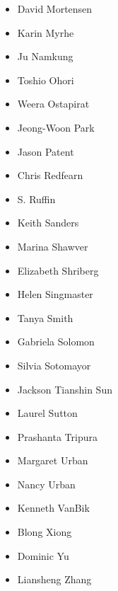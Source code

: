 \begin{multicols}{3}
\begin{itemize}
\item David Mortensen
\item Karin Myrhe
\item Ju Namkung
\item Toshio Ohori
\item Weera Ostapirat
\item Jeong-Woon Park
\item Jason Patent
\item Chris Redfearn
\item S. Ruffin
\item Keith Sanders
\item Marina Shawver
\item Elizabeth Shriberg
\item Helen Singmaster
\item Tanya Smith
\item Gabriela Solomon
\item Silvia Sotomayor
\item Jackson Tianshin Sun
\item Laurel Sutton
\item Prashanta Tripura
\item Margaret Urban
\item Nancy Urban
\item Kenneth VanBik
\item Blong Xiong
\item Dominic Yu
\item Liansheng Zhang
\end{itemize}
\end{multicols}